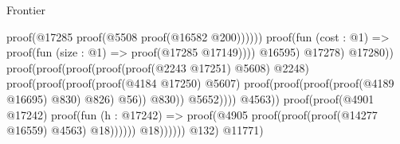 \begin{lexlean}{Frontier}
\begin{coremodule}
                                                                              proof(@17285
                                                                                  proof(@5508
                                                                                      proof(@16582
                                                                                          @200))))))
                                                                        proof(fun (cost : @1) =>
                                                                          proof(fun (size : @1) =>
                                                                            proof(@17285 @17149))))
                                                                      @16595)
                                                                    @17278)
                                                                  @17280))
                                                            proof(proof(proof(proof(proof(@2243
                                                                        @17251)
                                                                      @5608)
                                                                    @2248)
                                                                  proof(proof(proof(proof(@4184
                                                                            @17250)
                                                                          @5607)
                                                                        proof(proof(proof(proof(@4189
                                                                                  @16695)
                                                                                @830)
                                                                              @826)
                                                                            @56))
                                                                      @830))
                                                                @5652))))
                                                  @4563))
                                            proof(proof(@4901 @17242)
                                                proof(fun (h : @17242) =>
                                                  proof(@4905
                                                      proof(proof(proof(@14277 @16559) @4563)
                                                          @18))))))
                                      @18))))))
                      @132)
                    @11771)

\end{coremodule}
\end{lexlean}
